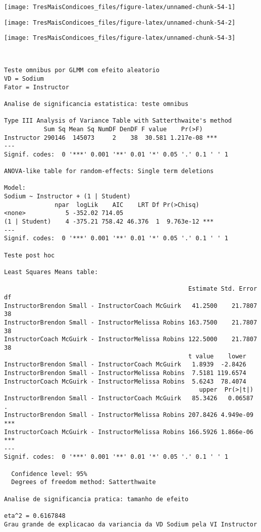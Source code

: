 \documentclass[]{article}
\begin{document}
\begin{center}\texttt{[image: TresMaisCondicoes\_files/figure-latex/unnamed-chunk-54-1]} \end{center}

\begin{center}\texttt{[image: TresMaisCondicoes\_files/figure-latex/unnamed-chunk-54-2]} \end{center}

\begin{center}\texttt{[image: TresMaisCondicoes\_files/figure-latex/unnamed-chunk-54-3]} \end{center}

\begin{verbatim}


Teste omnibus por GLMM com efeito aleatorio
VD = Sodium 
Fator = Instructor 

Analise de significancia estatistica: teste omnibus

Type III Analysis of Variance Table with Satterthwaite's method
           Sum Sq Mean Sq NumDF DenDF F value    Pr(>F)    
Instructor 290146  145073     2    38  30.581 1.217e-08 ***
---
Signif. codes:  0 '***' 0.001 '**' 0.01 '*' 0.05 '.' 0.1 ' ' 1

ANOVA-like table for random-effects: Single term deletions

Model:
Sodium ~ Instructor + (1 | Student)
              npar  logLik    AIC    LRT Df Pr(>Chisq)    
<none>           5 -352.02 714.05                         
(1 | Student)    4 -375.21 758.42 46.376  1  9.763e-12 ***
---
Signif. codes:  0 '***' 0.001 '**' 0.01 '*' 0.05 '.' 0.1 ' ' 1

Teste post hoc

Least Squares Means table:

                                                   Estimate Std. Error df
InstructorBrendon Small - InstructorCoach McGuirk   41.2500    21.7807 38
InstructorBrendon Small - InstructorMelissa Robins 163.7500    21.7807 38
InstructorCoach McGuirk - InstructorMelissa Robins 122.5000    21.7807 38
                                                   t value    lower
InstructorBrendon Small - InstructorCoach McGuirk   1.8939  -2.8426
InstructorBrendon Small - InstructorMelissa Robins  7.5181 119.6574
InstructorCoach McGuirk - InstructorMelissa Robins  5.6243  78.4074
                                                      upper  Pr(>|t|)    
InstructorBrendon Small - InstructorCoach McGuirk   85.3426   0.06587 .  
InstructorBrendon Small - InstructorMelissa Robins 207.8426 4.949e-09 ***
InstructorCoach McGuirk - InstructorMelissa Robins 166.5926 1.866e-06 ***
---
Signif. codes:  0 '***' 0.001 '**' 0.01 '*' 0.05 '.' 0.1 ' ' 1

  Confidence level: 95%
  Degrees of freedom method: Satterthwaite 

Analise de significancia pratica: tamanho de efeito

eta^2 = 0.6167848 
Grau grande de explicacao da variancia da VD Sodium pela VI Instructor 
\end{verbatim}
\end{document}
